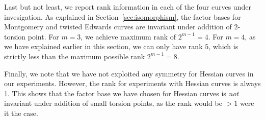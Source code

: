 

Last but not least, we report rank information in each of the four
curves under invesigation.
%
As explained in Section~\ref{sec:isomorphism}, the factor bases for
Montgomery and twisted Edwards curves are invariant under addition of
2-torsion point.
%
For $m=3$, we achieve maximum rank of $2^{m-1}=4$.
%
For $m=4$, as we have explained earlier in this section, we can only
have rank $5$, which is strictly less than the maximum possible rank
$2^{m-1}=8$.

Finally, we note that we have not exploited any symmetry for Hessian
curves in our experiments.
%
However, the rank for experiments with Hessian curves is always 1.
%
This shows that the factor base we have chosen for Hessian curves is
\emph{not} invariant under addition of small torsion points, as the
rank would be $>1$ were it the case.





